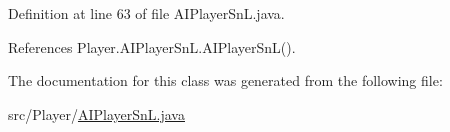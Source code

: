 Definition at line 63 of file A\+I\+Player\+Sn\+L.\+java.



References Player.\+A\+I\+Player\+Sn\+L.\+A\+I\+Player\+Sn\+L().



The documentation for this class was generated from the following file\+:\begin{DoxyCompactItemize}
\item 
src/\+Player/\hyperlink{_a_i_player_sn_l_8java}{A\+I\+Player\+Sn\+L.\+java}\end{DoxyCompactItemize}
